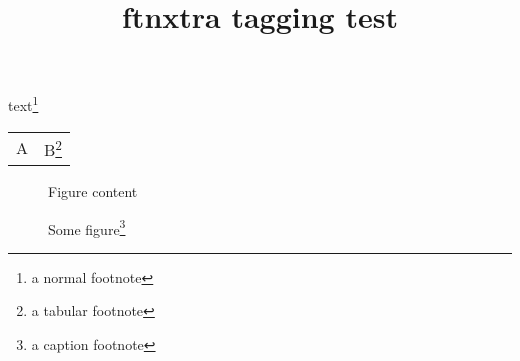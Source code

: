 \documentclass{article}
\title{ftnxtra tagging test}
\begin{document}
text\footnote{a normal footnote}

\begin{tabular}{cc}
A & B\footnote{a tabular footnote}
\end{tabular}

\begin{figure}
Figure content
\caption{Some figure\footnote{a caption footnote}}
\end{figure}
\end{document}
